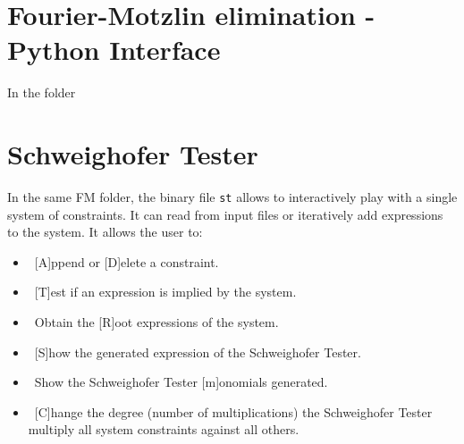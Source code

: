 \documentclass[12pt, a4paper]{report}
\begin{document}
\section{Fourier-Motzlin elimination - Python Interface}

In the folder

\section{Schweighofer Tester}
In the same FM folder, the binary file \texttt{st} allows to interactively play with a single system of constraints. It can read from input files or iteratively add expressions to the system. It allows the user to:
\begin{itemize}
	\item ~[A]ppend or [D]elete a constraint.
	\item ~[T]est if an expression is implied by the system.
	\item ~Obtain the [R]oot expressions of the system.
	\item ~[S]how the generated expression of the Schweighofer Tester.
	\item ~Show the Schweighofer Tester [m]onomials generated.
	\item ~[C]hange the degree (number of multiplications) the Schweighofer Tester multiply all system constraints against all others.
\end{itemize}
\end{document}
